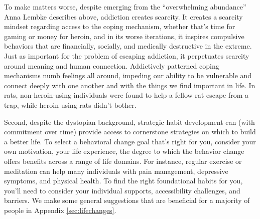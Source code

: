 \documentclass[12pt,letterpaper]{book}
\begin{document}
To make matters worse, despite emerging from the “overwhelming abundance” Anna Lembke describes above, addiction creates scarcity. It creates a scarcity mindset regarding access to the coping mechanism, whether that's time for gaming or money for heroin, and in its worse iterations, it inspires compulsive behaviors that are financially, socially, and medically destructive in the extreme. Just as important for the problem of escaping addiction, it perpetuates scarcity around meaning and human connection. Addictively patterned coping mechanisms numb feelings all around, impeding our ability to be vulnerable and connect deeply with one another and with the things we find important in life. In rats, non-heroin-using individuals were found to help a fellow rat escape from a trap, while heroin using rats didn't bother.

Second, despite the dystopian background, strategic habit development can (with commitment over time) provide access to cornerstone strategies on which to build a better life. To select a behavioral change goal that's right for you, consider your own motivation, your life experience, the degree to which the behavior change offers benefits across a range of life domains.  For instance, regular exercise or meditation can help many individuals with pain management, depressive symptoms, and physical health. To find the right foundational habits for you, you'll need to consider your individual supports, accessibility challenges, and barriers. We make some general suggestions that are beneficial for a majority of people in Appendix \ref{sec:lifechanges}.
\end{document}
